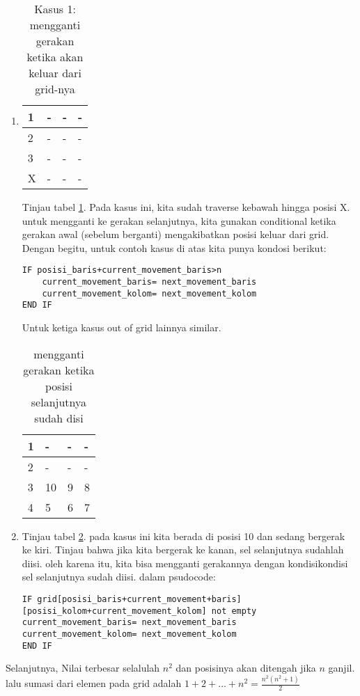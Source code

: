 \documentclass[12pt,letterpaper]{article}
\begin{document}
\begin{enumerate}
    \item 
    \begin{table}[!ht]
        \centering
        \caption{Kasus 1: mengganti gerakan ketika akan keluar dari grid-nya}
        \begin{tabular}{|l|l|l|l|}
        \hline
            1 & - & - & - \\ \hline
            2 & - & - & - \\ \hline
            3 & - & - & - \\ \hline
            X & - & - & - \\ \hline
        \end{tabular}
        \label{spiralgrid1}
    \end{table}

    Tinjau tabel \ref{spiralgrid1}. Pada kasus ini, kita sudah traverse kebawah hingga posisi X.
    untuk mengganti ke gerakan selanjutnya, kita gunakan conditional ketika gerakan awal (sebelum berganti) mengakibatkan posisi keluar dari grid.
    Dengan begitu, untuk contoh kasus di atas kita punya kondosi berikut:
    \begin{lstlisting}
IF posisi_baris+current_movement_baris>n
    current_movement_baris= next_movement_baris
    current_movement_kolom= next_movement_kolom
END IF
    \end{lstlisting}
    Untuk ketiga kasus out of grid lainnya similar.


    \begin{table}[!h]
        \centering
        \caption{mengganti gerakan ketika posisi selanjutnya sudah disi}
        \begin{tabular}{|l|l|l|l|}
        \hline
            1 & - & - & - \\ \hline
            2 & - & - & - \\ \hline
            3 & 10 & 9 & 8 \\ \hline
            4 & 5 & 6 & 7 \\ \hline
        \end{tabular}
        \label{spiralgrid2}
    \end{table}


    \item Tinjau tabel \ref{spiralgrid2}. pada kasus ini kita berada di posisi 10 dan sedang bergerak ke kiri.
    Tinjau bahwa jika kita bergerak ke kanan, sel selanjutnya sudahlah diisi. oleh karena itu,
    kita bisa mengganti gerakannya dengan kondisikondisi sel selanjutnya sudah diisi.
    dalam psudocode:
    \begin{lstlisting}
IF grid[posisi_baris+current_movement+baris][posisi_kolom+current_movement_kolom] not empty
current_movement_baris= next_movement_baris
current_movement_kolom= next_movement_kolom
END IF
    \end{lstlisting}


\end{enumerate}
Selanjutnya, Nilai terbesar selalulah $n^2$ dan posisinya akan ditengah jika $n$ ganjil.
lalu sumasi dari elemen pada grid adalah $1+2+\dots +n^2= \frac{n^2 (n^2+1)}{2}$
\end{document}

